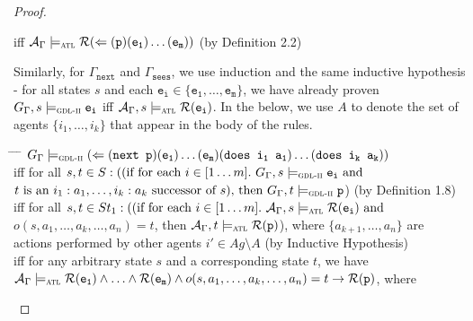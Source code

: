 \documentclass{article}
\theoremstyle{theorem}
\theoremstyle{lemma}
\theoremstyle{definition}
\theoremstyle{remark}
\begin{document}
\begin{proof}
\begin{tabbing}
    \>\> iff $\mathcal{A}_\Gamma \models_\textsc{atl} \mathcal{R}(\Leftarrow(\texttt{p})(\texttt{e}_\texttt{1}) \ldots(\texttt{e}_\texttt{m}))$ (by Definition 2.2)
    \end{tabbing}
    \par Similarly, for $\Gamma_\texttt{next}$ and $\Gamma_\texttt{sees}$, we use induction and the same inductive hypothesis - for all states $s$ and each $\texttt{e}_\texttt{i} \in \{\texttt{e}_\texttt{1}, \ldots, \texttt{e}_\texttt{m}\}$, we have already proven $G_\Gamma,s \models_\textsc{gdl-ii} \texttt{e}_\texttt{i}$ iff $\mathcal{A}_\Gamma,s \models_\textsc{atl} \mathcal{R}(\texttt{e}_\texttt{i})$. In the below, we use $A$ to denote the set of agents $\{i_1, \ldots, i_k\}$ that appear in the body of the rules.
    \begin{tabbing}
    \hspace{1.2cm} \= \hspace{1cm} \= \hspace{0.5cm} \= \kill
    \> $G_\Gamma \models_\textsc{gdl-ii}(\Leftarrow(\texttt{next p}) (\texttt{e}_\texttt{1}) \ldots(\texttt{e}_\texttt{m})(\texttt{does i\textsubscript{1} a\textsubscript{1}}) \ldots(\texttt{does i\textsubscript{k} a\textsubscript{k}}))$ \\
    \>\> iff for all $s,t \in S:((\text{if for each } i \in [1\ldots m].\ G_\Gamma, s \models_\textsc{gdl-ii} \texttt{e\textsubscript{i}}\text{ and }$ \\
    \>\>\>$t \text{ is an } i_1:a_1,\ldots,i_k:a_k \text{ successor of }s)\text{, then } G_\Gamma,t \models_\textsc{gdl-ii} \texttt{p}$) (by Definition 1.8) \\
    \>\> iff for all $s,t \in St_1:((\text{if for each } i \in [1\ldots m].\ \mathcal{A}_\Gamma, s \models_\textsc{atl} \mathcal{R}(\texttt{e}_\texttt{i}) \text{ and }$ \\
    \>\>\>$o(s, a_1, \ldots, a_k, \ldots, a_n)=t$, then $\mathcal{A}_\Gamma, t \models_\textsc{atl} \mathcal{R}(\texttt{p})$), where $\{a_{k+1}, \ldots, a_n\}$ are \\
    \>\>\> actions performed by other agents $i' \in Ag \text{\textbackslash} A$ (by Inductive Hypothesis) \\
    \>\> iff for any arbitrary state $s$ and a corresponding state $t$, we have \\
    \>\>\> $\mathcal{A}_\Gamma \models_\textsc{atl} \mathcal{R}(\texttt{e}_\texttt{1}) \wedge \ldots \wedge \mathcal{R}(\texttt{e}_\texttt{m}) \wedge o(s, a_1, \ldots, a_k, \ldots, a_n)=t \rightarrow \mathcal{R}(\texttt{p})$, where \\

\end{tabbing}
\end{proof}
\end{document}

